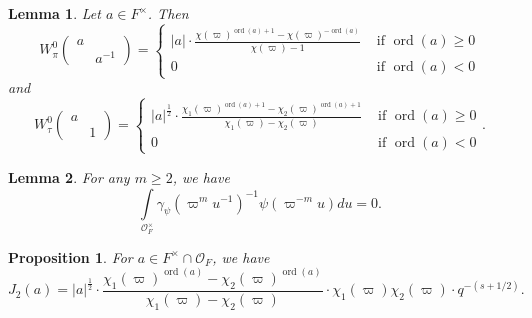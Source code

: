 \documentclass[10pt,a4paper]{amsart}
\newtheorem{lemma}{Lemma}
\newtheorem{proposition}{Proposition}
\newcommand{\on}{\operatorname}
\newcommand{\ord}{\on{ord}}
\begin{document}
\begin{lemma}\cite[Theorem 5.4]{CasselmanShalika1980II}
Let $a\in F^\times$. Then 
\begin{equation*}
W_\pi^0  \left( \begin{smallmatrix} a & \\ & a^{-1}\end{smallmatrix}\right) =  
 \begin{cases}
|a| \cdot \frac{\chi(\varpi)^{\ord(a)+1}-\chi(\varpi)^{-\ord(a)}}{\chi(\varpi)-1}   &\text{ if } \ord(a)\ge 0 \\
0 & \text{ if }\ord(a)< 0
\end{cases}
\end{equation*}
and 
\begin{equation*}
W_\tau^0\left( \begin{smallmatrix} a & \\&1\end{smallmatrix}\right)=
 \begin{cases}
 |a|^{\frac{1}{2}} \cdot   \frac{\chi_1(\varpi)^{\ord(a)+1}-\chi_2(\varpi)^{\ord(a)+1} }{\chi_1(\varpi)-\chi_2(\varpi)} &\text{ if }\ord(a)\ge 0\\
 0 &\text{ if }\ord(a)<0
 \end{cases}.
 \end{equation*}  
 \label{lemma-CasselmanShalika}
\end{lemma}

\begin{lemma}
For any $m\ge 2$, we have
$$
  \int\limits_{\mathcal{O}_F^\times} \gamma_\psi( \varpi^{m} u^{-1})^{-1}  \psi( \varpi^{-m} u)du=0.
$$
\label{lemma-local-integral-gamma-psi-vanishing}
\end{lemma}

\begin{proposition}
For $a\in F^\times \cap \mathcal{O}_F$, we have 
\begin{equation}
J_2(a)=   |a|^{\frac{1}{2}} \cdot \frac{\chi_1(\varpi)^{\ord(a)}-\chi_2(\varpi)^{\ord(a)}}{\chi_1(\varpi)-\chi_2(\varpi)}\cdot \chi_1(\varpi)\chi_2(\varpi) \cdot q^{-(s+1/2)}.
\label{eq-unramified-J2}
\end{equation}
\label{prop-unramified-J2}
\end{proposition}
\end{document}
